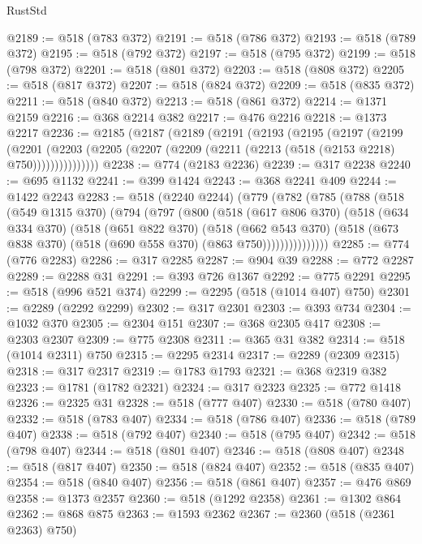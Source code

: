 \begin{lexlean}{RustStd}
\begin{coremodule}
@2189 := @518 (@783 @372)
@2191 := @518 (@786 @372)
@2193 := @518 (@789 @372)
@2195 := @518 (@792 @372)
@2197 := @518 (@795 @372)
@2199 := @518 (@798 @372)
@2201 := @518 (@801 @372)
@2203 := @518 (@808 @372)
@2205 := @518 (@817 @372)
@2207 := @518 (@824 @372)
@2209 := @518 (@835 @372)
@2211 := @518 (@840 @372)
@2213 := @518 (@861 @372)
@2214 := @1371 @2159
@2216 := @368 @2214 @382
@2217 := @476 @2216
@2218 := @1373 @2217
@2236 := @2185
    (@2187
      (@2189
        (@2191
          (@2193
            (@2195
              (@2197
                (@2199
                  (@2201
                    (@2203
                      (@2205 (@2207 (@2209 (@2211 (@2213 (@518 (@2153 @2218) @750)))))))))))))))
@2238 := @774 (@2183 @2236)
@2239 := @317 @2238
@2240 := @695 @1132
@2241 := @399 @1424
@2243 := @368 @2241 @409
@2244 := @1422 @2243
@2283 := @518
    (@2240 @2244)
    (@779
      (@782
        (@785
          (@788
            (@518
              (@549 @1315 @370)
              (@794
                (@797
                  (@800
                    (@518
                      (@617 @806 @370)
                      (@518
                        (@634 @334 @370)
                        (@518
                          (@651 @822 @370)
                          (@518
                            (@662 @543 @370)
                            (@518 (@673 @838 @370) (@518 (@690 @558 @370) (@863 @750)))))))))))))))
@2285 := @774 (@776 @2283)
@2286 := @317 @2285
@2287 := @904 @39
@2288 := @772 @2287
@2289 := @2288 @31
@2291 := @393 @726 @1367
@2292 := @775 @2291
@2295 := @518 (@996 @521 @374)
@2299 := @2295 (@518 (@1014 @407) @750)
@2301 := @2289 (@2292 @2299)
@2302 := @317 @2301
@2303 := @393 @734
@2304 := @1032 @370
@2305 := @2304 @151
@2307 := @368 @2305 @417
@2308 := @2303 @2307
@2309 := @775 @2308
@2311 := @365 @31 @382
@2314 := @518 (@1014 @2311) @750
@2315 := @2295 @2314
@2317 := @2289 (@2309 @2315)
@2318 := @317 @2317
@2319 := @1783 @1793
@2321 := @368 @2319 @382
@2323 := @1781 (@1782 @2321)
@2324 := @317 @2323
@2325 := @772 @1418
@2326 := @2325 @31
@2328 := @518 (@777 @407)
@2330 := @518 (@780 @407)
@2332 := @518 (@783 @407)
@2334 := @518 (@786 @407)
@2336 := @518 (@789 @407)
@2338 := @518 (@792 @407)
@2340 := @518 (@795 @407)
@2342 := @518 (@798 @407)
@2344 := @518 (@801 @407)
@2346 := @518 (@808 @407)
@2348 := @518 (@817 @407)
@2350 := @518 (@824 @407)
@2352 := @518 (@835 @407)
@2354 := @518 (@840 @407)
@2356 := @518 (@861 @407)
@2357 := @476 @869
@2358 := @1373 @2357
@2360 := @518 (@1292 @2358)
@2361 := @1302 @864
@2362 := @868 @875
@2363 := @1593 @2362
@2367 := @2360 (@518 (@2361 @2363) @750)

\end{coremodule}
\end{lexlean}
